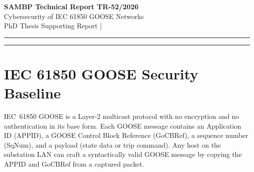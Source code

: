 \documentclass[11pt,a4paper]{article}
\begin{document}
\begin{center}
  {\LARGE\bfseries\color{sambpblue} SAMBP Technical Report TR-52/2026}\\[6pt]
  {\large Cybersecurity of IEC 61850 GOOSE Networks}\\[10pt]
  {\normalsize PhD Thesis Supporting Report \quad|}
\end{center}

\vspace{2pt}\hrule\vspace{8pt}

\begin{abstract}
\noindent
IEC~61850 GOOSE messages carry protection trip commands and setting-group
activations but provide no authentication in the base standard (Edition~1/2).
This report models four attack vectors against the SAMBP GOOSE network:
spoofing, replay, flooding, and man-in-the-middle.  Study~B shows that an
unprotected relay subject to a high-rate spoofing attacker
(1000\,packets/s) experiences $P(\text{false trip})=0.348$ per fault
event, while HMAC-SHA256 authentication reduces this to zero.  Study~C
establishes that sequence-number checking with a 0.5\,ms acceptance window
provides $>99\%$ replay detection.  Study~D quantifies HMAC-SHA256 at
0.360\,ms round-trip overhead --- 0.72\% of the 50\,ms trip budget ---
with 99.99\% detection of spoofing and man-in-the-middle attacks.
GOOSE flooding (DoS) is not mitigated by HMAC and requires switch-level
rate limiting as a complementary control.  The overall risk score
reduces from~51 to~23 (54.9\% reduction) with the combined
HMAC\,+\,SqNum\,+\,rate-limit countermeasure set.
\end{abstract}

\vspace{4pt}\hrule\vspace{10pt}

\section{IEC 61850 GOOSE Security Baseline}
\label{sec:baseline}

IEC~61850 GOOSE is a Layer-2 multicast protocol with no encryption and
no authentication in its base form.  Each GOOSE message contains an
Application ID (APPID), a GOOSE Control Block Reference (GoCBRef), a
sequence number (SqNum), and a payload (state data or trip command).
Any host on the substation LAN can craft a syntactically valid GOOSE
message by copying the APPID and GoCBRef from a captured packet.
\end{document}
